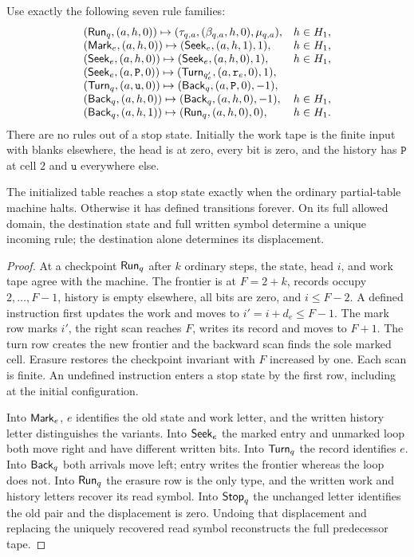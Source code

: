 Use exactly the following seven rule families:
\begin{equation}\label{bcs:expanded-table}
\begin{array}{lll}
 ({\sf Run}_q,(a,h,0))\mapsto(\tau_{q,a},(\beta_{q,a},h,0),\mu_{q,a}),&h\in H_1,\\
 ({\sf Mark}_e,(a,h,0))\mapsto({\sf Seek}_e,(a,h,1),1),&h\in H_1,\\
 ({\sf Seek}_e,(a,h,0))\mapsto({\sf Seek}_e,(a,h,0),1),&h\in H_1,\\
 ({\sf Seek}_e,(a,\mathtt P,0))\mapsto({\sf Turn}_{q'_e},(a,\mathtt r_e,0),1),\\
 ({\sf Turn}_q,(a,\mathtt u,0))\mapsto({\sf Back}_q,(a,\mathtt P,0),-1),\\
 ({\sf Back}_q,(a,h,0))\mapsto({\sf Back}_q,(a,h,0),-1),&h\in H_1,\\
 ({\sf Back}_q,(a,h,1))\mapsto({\sf Run}_q,(a,h,0),0),&h\in H_1.
\end{array}
\end{equation}
There are no rules out of a stop state. Initially the work tape is the finite input with blanks elsewhere, the head is at zero, every bit is zero, and the history has $\mathtt P$ at cell $2$ and $\mathtt u$ everywhere else.

\begin{lemma}\label{bcs:expanded-compiler}
The initialized table reaches a stop state exactly when the ordinary partial-table machine halts. Otherwise it has defined transitions forever. On its full allowed domain, the destination state and full written symbol determine a unique incoming rule; the destination alone determines its displacement.
\end{lemma}
\begin{proof}
At a checkpoint ${\sf Run}_q$ after $k$ ordinary steps, the state, head $i$, and work tape agree with the machine. The frontier is at $F=2+k$, records occupy $2,\ldots,F-1$, history is empty elsewhere, all bits are zero, and $i\le F-2$. A defined instruction first updates the work and moves to $i'=i+d_e\le F-1$. The mark row marks $i'$, the right scan reaches $F$, writes its record and moves to $F+1$. The turn row creates the new frontier and the backward scan finds the sole marked cell. Erasure restores the checkpoint invariant with $F$ increased by one. Each scan is finite. An undefined instruction enters a stop state by the first row, including at the initial configuration.

Into ${\sf Mark}_e$, $e$ identifies the old state and work letter, and the written history letter distinguishes the variants. Into ${\sf Seek}_e$ the marked entry and unmarked loop both move right and have different written bits. Into ${\sf Turn}_q$ the record identifies $e$. Into ${\sf Back}_q$ both arrivals move left; entry writes the frontier whereas the loop does not. Into ${\sf Run}_q$ the erasure row is the only type, and the written work and history letters recover its read symbol. Into ${\sf Stop}_q$ the unchanged letter identifies the old pair and the displacement is zero. Undoing that displacement and replacing the uniquely recovered read symbol reconstructs the full predecessor tape.
\end{proof}

